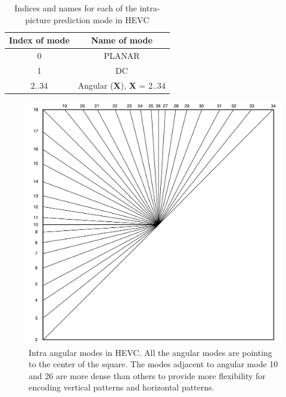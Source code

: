 \begin{table}[t]
    \caption{Indices and names for each of the intra-picture prediction mode in HEVC}
    \bigskip\label{tab:intra-prediction-tools-in-hevc}
    \centering
    \begin{tabular}{c c}
        \toprule
        Index of mode & Name of mode\\
        \midrule
        0  & PLANAR \\
        1  & DC \\
        2..34 & Angular (\textbf{X}), \textbf{X} = 2..34  \\
        \bottomrule
    \end{tabular}
\end{table}

\begin{figure}
    \centering
    \includegraphics[width=\textwidth,height=\textheight,keepaspectratio]{Figures/intra-angular-modes-in-hevc.pdf}
    \caption[Angular modes in HEVC]
    {Intra angular modes in HEVC\@.
    All the angular modes are pointing to the center of the square.
    The modes adjacent to angular mode 10 and 26 are more dense
    than others to provide more flexibility for encoding vertical
    patterns and horizontal patterns.
    }\label{fig:intra-angular-modes}
\end{figure}


